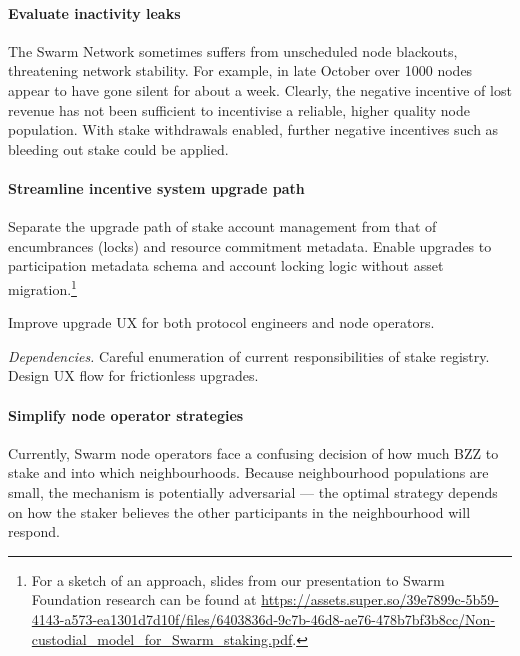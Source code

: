 \paragraph{Evaluate inactivity leaks}
%
The Swarm Network sometimes suffers from unscheduled node blackouts, threatening network stability. 
%
For example, in late October over 1000 nodes appear to have gone silent for about a week.
%
Clearly, the negative incentive of lost revenue has not been sufficient to incentivise a reliable, higher quality node population.
%
With stake withdrawals enabled, further negative incentives such as bleeding out stake could be applied.

\paragraph{Streamline incentive system upgrade path}
    Separate the upgrade path of stake account management from that of encumbrances (locks) and resource commitment metadata.
    Enable upgrades to participation metadata schema and account locking logic without asset migration.\footnote{For a sketch of an approach, slides from our presentation to Swarm Foundation research can be found at \url{https://assets.super.so/39e7899c-5b59-4143-a573-ea1301d7d10f/files/6403836d-9c7b-46d8-ae76-478b7bf3b8cc/Non-custodial_model_for_Swarm_staking.pdf}.}

    Improve upgrade UX for both protocol engineers and node operators.

    \emph{Dependencies.}
    Careful enumeration of current responsibilities of stake registry.
    Design UX flow for frictionless upgrades.

\paragraph{Simplify node operator strategies}
%
Currently, Swarm node operators face a confusing decision of how much BZZ to stake and into which neighbourhoods.
%
Because neighbourhood populations are small, the mechanism is potentially adversarial — the optimal strategy depends on how the staker believes the other participants in the neighbourhood will respond.

